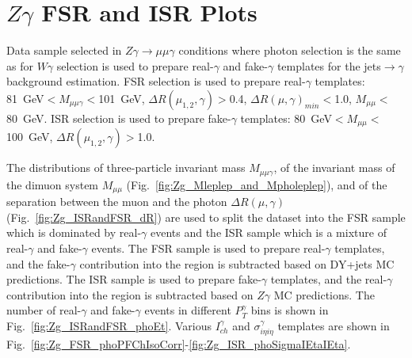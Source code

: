 \chapter{$Z\gamma$ FSR and ISR Plots}
\label{sec:ZgFSRandISRplots}

Data sample selected in $Z\gamma\rightarrow\mu\mu\gamma$ conditions where photon selection is the same as for $W\gamma$ selection is used to prepare real-$\gamma$ and fake-$\gamma$ templates for the jets$\rightarrow\gamma$ background estimation. FSR selection is used to prepare real-$\gamma$ templates: 81~GeV$<M_{\mu\mu\gamma}<$101~GeV, $\Delta{R}(\mu_{1,2},\gamma)>$0.4, $\Delta{R}(\mu,\gamma)_{min}<$1.0, $M_{\mu\mu}<$80~GeV. ISR selection is used to prepare fake-$\gamma$ templates: 80~GeV$<M_{\mu\mu}<$100~GeV, $\Delta{R}(\mu_{1,2},\gamma)>$1.0.

The distributions of three-particle invariant mass $M_{\mu\mu\gamma}$, of the invariant mass of the dimuon system $M_{\mu\mu}$ (Fig.~\ref{fig:Zg_Mleplep_and_Mpholeplep}), and of the separation between the muon and the photon $\Delta R(\mu,\gamma)$ (Fig.~\ref{fig:Zg_ISRandFSR_dR}) are used to split the dataset into the FSR sample which is dominated by real-$\gamma$ events and the ISR sample which is a mixture of real-$\gamma$ and fake-$\gamma$ events. The FSR sample is used to prepare real-$\gamma$ templates, and the fake-$\gamma$ contribution into the region is subtracted based on DY+jets MC predictions. The ISR sample is used to prepare fake-$\gamma$ templates, and the real-$\gamma$ contribution into the region is subtracted based on $Z\gamma$ MC predictions. The number of real-$\gamma$ and fake-$\gamma$ events in different $P_T^\gamma$ bins is shown in Fig.~\ref{fig:Zg_ISRandFSR_phoEt}. Various $I_{ch}^\gamma$ and $\sigma_{i \eta i \eta}^\gamma$ templates are shown in Fig.~\ref{fig:Zg_FSR_phoPFChIsoCorr}-\ref{fig:Zg_ISR_phoSigmaIEtaIEta}.

